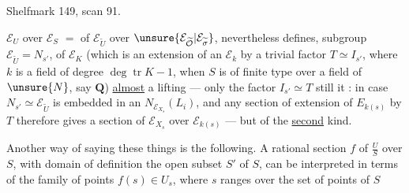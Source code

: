 Shelfmark 149, scan 91.

$\mathcal E_U$ over $\mathcal E_S$  $=$ of $\mathcal E_{\widetilde U}$ over $\unsure{\mathcal E_{\widetilde{\mathcal O}}|\mathcal E_{\widetilde\sigma}}$, nevertheless defines,   subgroup $\mathcal E_{\widetilde U}=N_{s'}$, of $\mathcal E_K$ (which is an extension of an $\mathcal E_k$ by a trivial  factor $T\simeq I_{s'}$, where $k$ is a field of  degree $\deg\operatorname{tr}K-1$, when $S$ is of finite type over a field of $\unsure{N}$, say $\mathbf Q$) \uline{almost} a lifting --- only the factor $I_{s'}\simeq T$ still  it : in  case $N_{s'}\simeq\mathcal E_{\widetilde U}$ is embedded in an $N_{\mathcal E_{X_s}}(L_i)$, and any section of  extension of $E_{k(s)}$ by $T$ therefore gives a section of $\mathcal E_{X_s}$ over $\mathcal E_{k(s)}$ --- but of the \uline{second} kind.

Another way of saying these things is the following. A rational section $f$ of $\frac{U}{S}$ over $S$, with domain of definition the open subset $S'$ of $S$,  can be interpreted in terms of the family of points $f(s)\in U_s$, where $s$ ranges over the set of points of $S$
